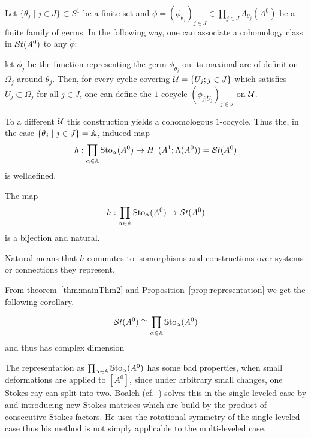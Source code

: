 Let $\{\theta_j\mid j\in J\}\subset S^1$ be a finite set and
$\dot\phi=(\dot\phi_{\theta_j})_{j\in J}
\in\prod_{j\in J}\Lambda_{\theta_j}(A^0)$ be a finite family of germs.
In the following way, one can associate a cohomology class in $\mathcal{S}{}t(A^0)$ to any
$\dot\phi$:
\begin{einr}
  let $\dot\phi_j$ be the function representing the germ
  $\dot\phi_{\theta_j}$ on its maximal arc of definition $\Omega_j$ around
  $\theta_j$.
  Then, for every cyclic covering $\mathcal{U}=\{U_j;j\in J\}$ which satisfies
  $\dot U_j\subset \Omega_j$ for all $j\in J$, one can define the $1$-cocycle
  $(\dot\phi_{j|\dot U_j})_{j\in J}$ on $\mathcal{U}$.
\end{einr}
To a different $\mathcal{U}$ this construction yields a cohomologous
$1$-cocycle\TODO[Proof]. Thus the, in the case $\{\theta_j\mid j\in J\}=\mathbb{A}$,
induced map
\[
  h:\prod_{\alpha\in\mathbb{A}}\operatorname{Sto}_\alpha(A^0)\to
  H^1(A^1;\Lambda(A^0))=\mathcal{S}{}t(A^0)
\]
is welldefined.
\begin{tthm}
  \label{thm:mainThm2}
  The map
  \[
    h:\prod_{\alpha\in\mathbb{A}}\operatorname{Sto}_\alpha(A^0)\to\mathcal{S}{}t(A^0)
  \]
  is a bijection and natural.
  \begin{s-rem}
    Natural means that $h$ commutes to isomorphisms and constructions over
    systems or connections they represent.
    \begin{comment}
      See \cite{Loday1994} Section III.3.3
    \end{comment}
  \end{s-rem}
\end{tthm}
From theorem~\ref{thm:mainThm2} and Proposition~\ref{prop:representation} we
get the following corollary.
\begin{cor}
  \[
    \mathcal{S}{}t(A^0) \cong \prod_{\alpha\in\mathbb{A}}\operatorname{\mathbb{S}to}_\alpha(A^0)
  \]
  and thus has complex dimension \TODO{}
  \begin{s-rem}
    The representation as $\prod_{\alpha\in\mathbb{A}}\operatorname{\mathbb{S}to}_\alpha(A^0)$ has some bad
    properties, when small deformations are applied to $[A^0]$, since under
    arbitrary small changes, one Stokes ray can split into two. Boalch
    (cf.~\cite{boalch,thboalch}) solves this in the single-leveled case by
     and introducing new
    Stokes matrices which are build by the product of consecutive Stokes
    factors. He uses the rotational symmetry of the single-leveled case thus
    his method is not simply applicable to the multi-leveled case.
  \end{s-rem}
\end{cor}

